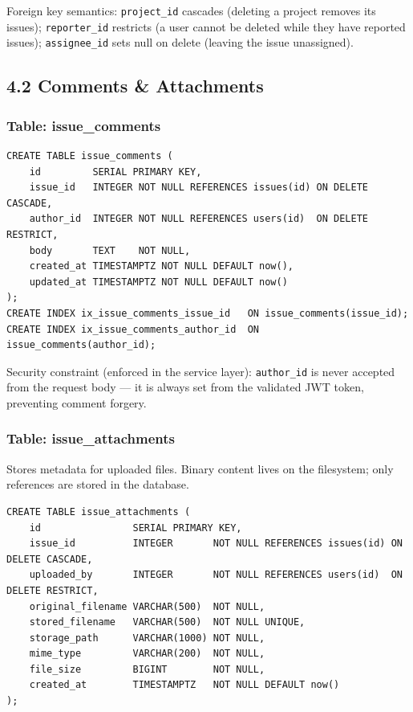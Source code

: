 \documentclass[11pt]{article}
\begin{document}
\vspace{4pt}
Foreign key semantics: \texttt{project\_id} cascades (deleting a project removes its issues); \texttt{reporter\_id} restricts (a user cannot be deleted while they have reported issues); \texttt{assignee\_id} sets null on delete (leaving the issue unassigned).

\subsection{4.2 Comments \& Attachments}

\subsubsection{Table: issue\_comments}
\begin{lstlisting}
CREATE TABLE issue_comments (
    id         SERIAL PRIMARY KEY,
    issue_id   INTEGER NOT NULL REFERENCES issues(id) ON DELETE CASCADE,
    author_id  INTEGER NOT NULL REFERENCES users(id)  ON DELETE RESTRICT,
    body       TEXT    NOT NULL,
    created_at TIMESTAMPTZ NOT NULL DEFAULT now(),
    updated_at TIMESTAMPTZ NOT NULL DEFAULT now()
);
CREATE INDEX ix_issue_comments_issue_id   ON issue_comments(issue_id);
CREATE INDEX ix_issue_comments_author_id  ON issue_comments(author_id);
\end{lstlisting}

Security constraint (enforced in the service layer): \texttt{author\_id} is never accepted from the request body --- it is always set from the validated JWT token, preventing comment forgery.

\subsubsection{Table: issue\_attachments}
Stores metadata for uploaded files. Binary content lives on the filesystem; only references are stored in the database.

\begin{lstlisting}
CREATE TABLE issue_attachments (
    id                SERIAL PRIMARY KEY,
    issue_id          INTEGER       NOT NULL REFERENCES issues(id) ON DELETE CASCADE,
    uploaded_by       INTEGER       NOT NULL REFERENCES users(id)  ON DELETE RESTRICT,
    original_filename VARCHAR(500)  NOT NULL,
    stored_filename   VARCHAR(500)  NOT NULL UNIQUE,
    storage_path      VARCHAR(1000) NOT NULL,
    mime_type         VARCHAR(200)  NOT NULL,
    file_size         BIGINT        NOT NULL,
    created_at        TIMESTAMPTZ   NOT NULL DEFAULT now()
);
\end{lstlisting}
\end{document}
